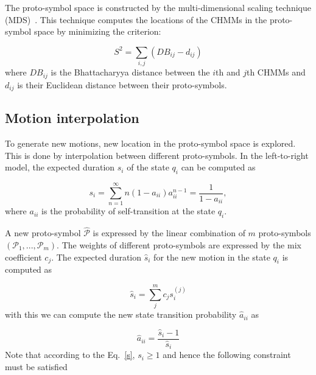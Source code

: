 The proto-symbol space is constructed by the multi-dimensional scaling technique (MDS)~\citep{schiffman1981introduction}. This technique computes the locations of the CHMMs in the proto-symbol space by minimizing the criterion:

\begin{equation}
S^2 = \sum_{i,j}\left(DB_{ij}-d_{ij}\right)
\end{equation}
where $DB_{ij}$ is the Bhattacharyya distance between the $i$th and $j$th CHMMs and $d_{ij}$ is their Euclidean distance between their proto-symbols. %



\subsection{Motion interpolation}
\label{cha5:sec2:interpolation}
To generate new motions, new location in the proto-symbol space is explored. This is done by interpolation between different proto-symbols.
In the left-to-right model, the expected duration $s_i$ of the state $q_i$ can be computed as

\begin{equation}
\label{sequation}
s_i = \sum_{n=1}^{\infty} n(1-a_{ii})a_{ii}^{n-1} = \frac{1}{1-a_{ii}},
\end{equation}
where $a_{ii}$ is the probability of self-transition at the state $q_i$.

A new proto-symbol $\hat{\mathcal{P}}$ is expressed by the linear combination of $m$ proto-symbols $(\mathcal{P}_1, ..., \mathcal{P}_m)$. The weights of different proto-symbols are expressed by the mix coefficient $c_j$. The expected duration $\hat{s}_i$ for the new motion in the state $q_i$ is computed as

\begin{equation}
\hat{s}_i = \sum_j^mc_js_i^{(j)}
\label{s}
\end{equation}
with this we can compute the new state transition probability $\hat{a}_{ii}$ as

\begin{equation}
\hat{a}_{ii} = \frac{\hat{s}_i-1}{\hat{s}_i}
\end{equation}
Note that according to the Eq.~\ref{s}, $s_i\ge1$ and hence the following constraint must be satisfied

